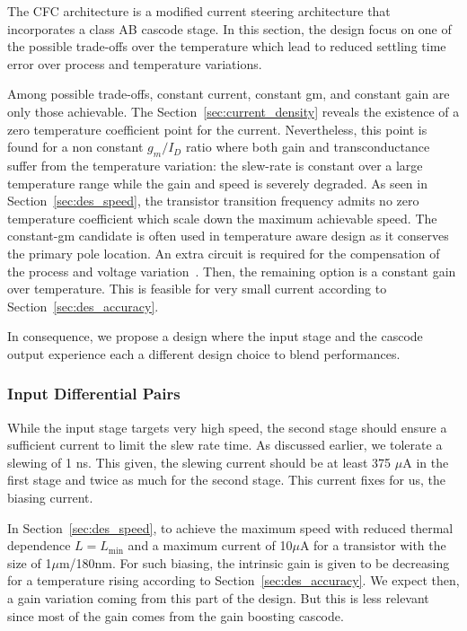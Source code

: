 The CFC architecture is a modified current steering architecture that incorporates a class AB cascode stage. In this section, the design focus on one of the possible trade-offs over the temperature which lead to reduced settling time error over process and temperature variations.

Among possible trade-offs, constant current, constant gm, and constant gain are only those achievable. The Section~\ref{sec:current_density} reveals the existence of a zero temperature coefficient point for the current. Nevertheless, this point is found for a non constant \(g_m/I_D \) ratio where both gain and transconductance suffer from the temperature variation: the slew-rate is constant over a large temperature range while the gain and speed is severely degraded. As seen in Section~\ref{sec:des_speed}, the transistor transition frequency admits no zero temperature coefficient which scale down the maximum achievable speed. The constant-gm candidate is often used in temperature aware design as it conserves the primary pole location. An extra circuit is required for the compensation of the process and voltage variation~\cite{Chu2014}. Then, the remaining option is a constant gain over temperature. This is feasible for very small current according to Section~\ref{sec:des_accuracy}.

In consequence, we propose a design where the input stage and the cascode output experience each a different design choice to blend performances.

\subsubsection{Input Differential Pairs}
While the input stage targets very high speed, the second stage should ensure a sufficient current to limit the slew rate time. As discussed earlier, we tolerate a slewing of 1 ns. This given, the slewing current should be at least 375 \(\mu \)A in the first stage and twice as much for the second stage. This current fixes for us, the biasing current.

In Section~\ref{sec:des_speed}, to achieve the maximum speed with reduced thermal dependence \(L=L_{\min} \) and a maximum current of 10\(\mu \)A for a transistor with the size of 1\(\mu \)m/180nm. For such biasing, the intrinsic gain is given to be decreasing for a temperature rising according to Section~\ref{sec:des_accuracy}. We expect then, a gain variation coming from this part of the design. But this is less relevant since most of the gain comes from the gain boosting cascode.

